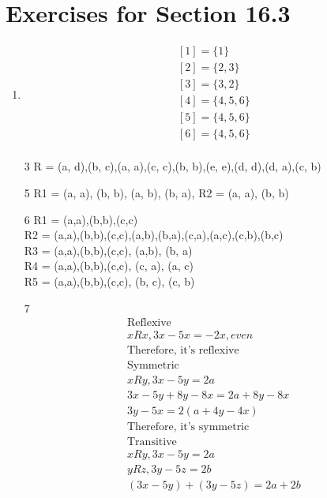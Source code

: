 \documentclass[12pt]{article}
\begin{document}
\section*{Exercises for Section 16.3}
\begin{enumerate}
    \item
	\begin{equation*}
	    \begin{split}
		[1] = \{1\}\\
		[2] = \{2, 3\}\\
		[3] = \{3, 2\}\\
		[4] = \{4, 5, 6\}\\
		[5] = \{4, 5, 6\}\\
		[6] = \{4, 5, 6\}\\
	    \end{split}
	\end{equation*}
    \item [3] R = {(a, d),(b, c),(a, a),(c, c),(b, b),(e, e),(d, d),(d, a),(c, b)}
    \item [5] R1 = {(a, a), (b, b), (a, b), (b, a)}, R2 = {(a, a), (b, b)}
    \item [6] R1 = {(a,a),(b,b),(c,c)}\\
	R2 = {(a,a),(b,b),(c,c),(a,b),(b,a),(c,a),(a,c),(c,b),(b,c)}\\
	R3 = {(a,a),(b,b),(c,c), (a,b), (b, a)}\\
	R4 = {(a,a),(b,b),(c,c), (c, a), (a, c)}\\
	R5 = {(a,a),(b,b),(c,c), (b, c), (c, b)}\\
	\item [7]
	    \begin{equation*}
		\begin{split}
		    \text{Reflexive}\\
		    xRx, 3x-5x = -2x, even\\
		    \text{Therefore, it's reflexive}\\
		    \text{Symmetric}\\
		    xRy, 3x-5y = 2a\\
		    3x-5y + 8y -8x = 2a + 8y-8x\\
		    3y -5x = 2(a + 4y -4x)\\
		    \text{Therefore, it's symmetric}\\
		    \text{Transitive}\\
		    xRy, 3x-5y = 2a\\
		    yRz, 3y-5z = 2b\\
		    (3x-5y) +(3y-5z) = 2a + 2b\\

\end{split}
\end{equation*}
\end{enumerate}
\end{document}
